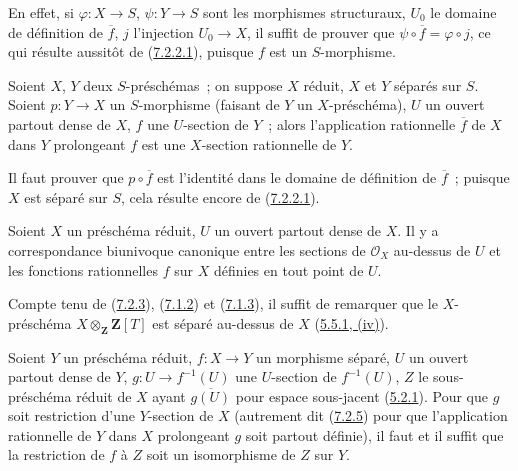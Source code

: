En effet, si $\varphi:X\to S$, $\psi:Y\to S$ sont les morphismes structuraux,
$U_0$ le domaine de définition de $\overline f$, $j$ l'injection $U_0\to X$,
il suffit de prouver que $\psi\circ\overline f=\varphi\circ j$, ce qui résulte
aussitôt de (\hyperref[I.7.2.2.1-fr]{7.2.2.1}), puisque $f$ est un
$S$-morphisme.

\begin{corollary}[7.2.5]
\label{I.7.2.5-fr}
Soient $X$, $Y$ deux $S$-préschémas~; on suppose $X$ réduit, $X$ et $Y$
séparés sur $S$. Soient $p:Y\to X$ un $S$-morphisme (faisant de $Y$ un
$X$-préschéma), $U$ un ouvert partout dense de $X$, $f$ une $U$-section de
$Y$~; alors l'application rationnelle $\overline f$ de $X$ dans $Y$
prolongeant $f$ est une $X$-section rationnelle de $Y$.
\end{corollary}

Il faut prouver que $p\circ\overline f$ est l'identité dans le domaine de
définition de $\overline f$~; puisque $X$ est séparé sur $S$, cela résulte
encore de (\hyperref[I.7.2.2.1-fr]{7.2.2.1}).

\begin{corollary}[7.2.6]
\label{I.7.2.6-fr}
Soient $X$ un préschéma réduit, $U$ un ouvert partout dense de $X$. Il y a
correspondance biunivoque canonique entre les sections de $\mathscr{O}_X$ au-dessus
de $U$ et les fonctions rationnelles $f$ sur $X$ définies en tout point de $U$.
\end{corollary}

Compte tenu de (\hyperref[I.7.2.3-fr]{7.2.3}),
(\hyperref[I.7.1.2-fr]{7.1.2}) et (\hyperref[I.7.1.3-fr]{7.1.3}), il suffit de
remarquer que le $X$-préschéma $X\otimes_{\mathbf Z}\mathbf Z[T]$ est séparé
au-dessus de $X$ (\hyperref[I.5.5.1-fr]{5.5.1, (iv)}).

\begin{corollary}[7.2.7]
\label{I.7.2.7-fr}
Soient $Y$ un préschéma réduit, $f:X\to Y$ un morphisme séparé, $U$ un ouvert
partout dense de $Y$, $g:U\to f^{-1}(U)$ une $U$-section de $f^{-1}(U)$, $Z$
le sous-préschéma réduit de $X$ ayant $\overline{g(U)}$ pour espace sous-jacent
(\hyperref[I.5.2.1-fr]{5.2.1}). Pour que $g$ soit restriction d'une
$Y$-section de $X$ (autrement dit (\hyperref[I.7.2.5-fr]{7.2.5}) pour que
l'application rationnelle de $Y$ dans $X$ prolongeant $g$ soit partout
définie), il faut et il suffit que la restriction de $f$ à $Z$ soit un
isomorphisme de $Z$ sur $Y$.
\end{corollary}

